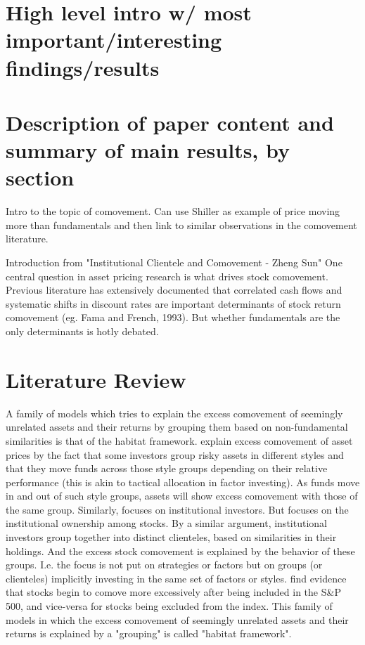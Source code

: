\section{High level intro w/ most important/interesting findings/results}
\section{Description of paper content and summary of main results, by section}


Intro to the topic of comovement. Can use Shiller as example of price moving more than fundamentals and then link to similar observations in the comovement literature.
\vspace{1cm}

Introduction from "Institutional Clientele and Comovement - Zheng Sun"
One central question in asset pricing research is what drives stock comovement. Previous
literature has extensively documented that correlated cash flows and systematic shifts in
discount rates are important determinants of stock return comovement (eg. Fama and
French, 1993). But whether fundamentals are the only determinants is hotly debated.


\section{Literature Review}

A family of models which tries to explain the excess comovement of seemingly unrelated assets and their returns by grouping them based on non-fundamental similarities is that of the habitat framework. \textcite{Barberis2003} explain excess comovement of asset prices by the fact that some investors group risky assets in different styles and that they move funds across those style groups depending on their relative performance (this is akin to tactical allocation in factor investing). As funds move in and out of such style groups, assets will show excess comovement with those of the same group. Similarly, \textcite{Sun2008} focuses on institutional investors. But focuses on the institutional ownership among stocks. By a similar argument, institutional investors group together into distinct clienteles, based on similarities in their holdings. And the excess stock comovement is explained by the behavior of these groups. I.e. the focus is not put on strategies or factors but on groups (or clienteles) implicitly investing in the same set of factors or styles. \textcite{Barberis2005} find evidence that stocks begin to comove more excessively after being included in the S\&P 500, and vice-versa for stocks being excluded from the index. This family of models in which the excess comovement of seemingly unrelated assets and their returns is explained by a "grouping" is called "habitat framework".

